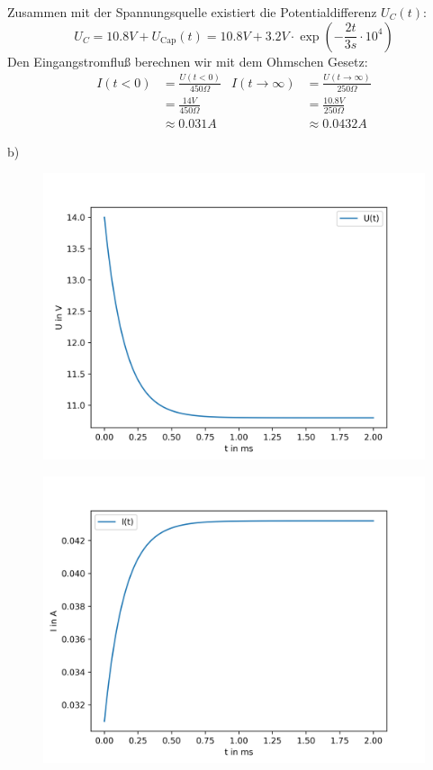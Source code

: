 \documentclass[11pt a4paper]{article}
\begin{document}
Zusammen mit der Spannungsquelle existiert die Potentialdifferenz $U_C(t)$:
\[
	U_C = 10.8V + U_\text{Cap} (t) = 
	10.8V + 3.2 V \cdot  \exp\left( -\frac{2t}{3s} \cdot 10^4\right)
\]
\newpage
Den Eingangstromfluß berechnen wir mit dem Ohmschen Gesetz:
\begin{align*}
	I(t < 0) &= \frac{U(t<0)}{450\Omega} &
	I(t \rightarrow \infty) &= \frac{U(t \rightarrow \infty)}{250\Omega}
	\\
	&= \frac{14V}{450\Omega} & &= \frac{10.8V}{250\Omega} \\
	&\approx 0.031 A & &\approx 0.0432A
\end{align*}

b)

\begin{figure}[H]
	\centering
	\includegraphics[width=12cm]{aufgabe5b_U.png}
\end{figure}

\begin{figure}[H]
	\centering
	\includegraphics[width=12cm]{aufgabe5b_I.png}
\end{figure}
\end{document}
